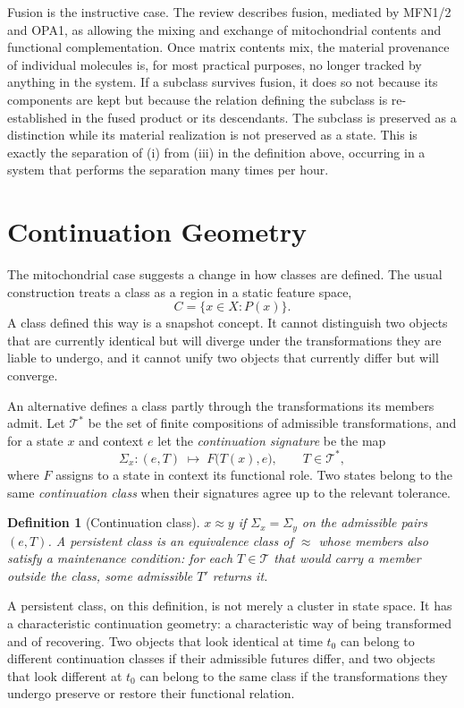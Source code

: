 \documentclass[11pt]{article}
\newtheorem{definition}{Definition}
\theoremstyle{remark}
\begin{document}
Fusion is the instructive case. The review describes fusion, mediated by MFN1/2 and OPA1, as allowing the mixing and exchange of mitochondrial contents and functional complementation. Once matrix contents mix, the material provenance of individual molecules is, for most practical purposes, no longer tracked by anything in the system. If a subclass survives fusion, it does so not because its components are kept but because the relation defining the subclass is re-established in the fused product or its descendants. The subclass is preserved as a distinction while its material realization is not preserved as a state. This is exactly the separation of (i) from (iii) in the definition above, occurring in a system that performs the separation many times per hour.

\section{Continuation Geometry}

The mitochondrial case suggests a change in how classes are defined. The usual construction treats a class as a region in a static feature space,
\[
C=\{x\in X : P(x)\}.
\]
A class defined this way is a snapshot concept. It cannot distinguish two objects that are currently identical but will diverge under the transformations they are liable to undergo, and it cannot unify two objects that currently differ but will converge.

An alternative defines a class partly through the transformations its members admit. Let $\mathcal T^*$ be the set of finite compositions of admissible transformations, and for a state $x$ and context $e$ let the \emph{continuation signature} be the map
\[
\Sigma_x : (e, T)\;\longmapsto\; F\bigl(T(x), e\bigr),\qquad T\in\mathcal T^*,
\]
where $F$ assigns to a state in context its functional role. Two states belong to the same \emph{continuation class} when their signatures agree up to the relevant tolerance.

\begin{definition}[Continuation class]
$x \approx y$ if $\Sigma_x = \Sigma_y$ on the admissible pairs $(e,T)$. A \emph{persistent class} is an equivalence class of $\approx$ whose members also satisfy a maintenance condition: for each $T\in\mathcal T$ that would carry a member outside the class, some admissible $T'$ returns it.
\end{definition}

A persistent class, on this definition, is not merely a cluster in state space. It has a characteristic continuation geometry: a characteristic way of being transformed and of recovering. Two objects that look identical at time $t_0$ can belong to different continuation classes if their admissible futures differ, and two objects that look different at $t_0$ can belong to the same class if the transformations they undergo preserve or restore their functional relation.
\end{document}
